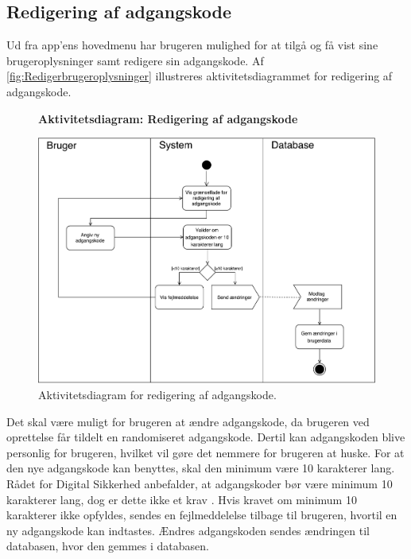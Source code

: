 \subsection*{Redigering af adgangskode} \label{sec:redigrering}
Ud fra app'ens hovedmenu har brugeren mulighed for at tilgå og få vist sine brugeroplysninger samt redigere sin adgangskode. Af \autoref{fig:Redigerbrugeroplysninger} illustreres aktivitetsdiagrammet for redigering af adgangskode.  

\begin{figure}[H]
\centering
\textbf{Aktivitetsdiagram: Redigering af adgangskode}\par\medskip
\includegraphics[width=1\textwidth]{figures/aktivitetsdiagram/Redigerbrugeroplysninger}
\caption{Aktivitetsdiagram for redigering af adgangskode.}
\label{fig:Redigerbrugeroplysninger}
\end{figure}

\noindent
Det skal være muligt for brugeren at ændre adgangskode, da brugeren ved oprettelse får tildelt en randomiseret adgangskode. Dertil kan adgangskoden blive personlig for brugeren, hvilket vil gøre det nemmere for brugeren at huske. 
For at den nye adgangskode kan benyttes, skal den minimum være 10 karakterer lang. Rådet for Digital Sikkerhed anbefalder, at adgangskoder bør være minimum 10 karakterer lang, dog er dette ikke et krav \citep{sikkerhed2015}.
Hvis kravet om minimum 10 karakterer ikke opfyldes, sendes en fejlmeddelelse tilbage til brugeren, hvortil en ny adgangskode kan indtastes. 
Ændres adgangskoden sendes ændringen til databasen, hvor den gemmes i databasen.